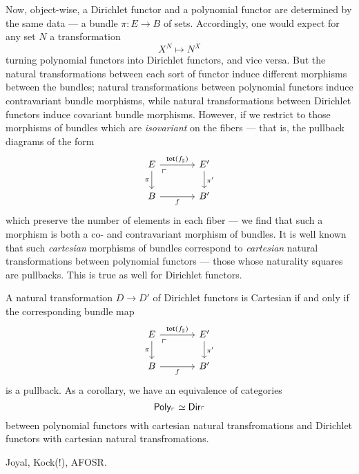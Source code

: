 Now, object-wise, a Dirichlet functor and a polynomial functor are determined by
the same data --- a bundle $\pi : E \to B$ of sets. Accordingly, one would
expect for any set $N$ a transformation
$$X^N \mapsto N^X$$
turning polynomial functors into Dirichlet functors, and vice versa. But the
natural transformations between each sort of functor induce different morphisms
between the bundles; natural transformations between polynomial functors induce
contravariant bundle morphisms, while natural transformations between Dirichlet
functors induce covariant bundle morphisms. However, if we restrict to those
morphisms of bundles which are \emph{isovariant} on the fibers --- that is, the
pullback diagrams of the form
\[
  \begin{tikzcd}[column sep=large]
E \arrow[r, "\term{tot}(f_{\sharp})"] \arrow[d, "\pi"'] \arrow[dr, phantom,
"\ulcorner" very near start] & E' \arrow[d, "\pi'"] \\
B \arrow[r, "f"']                                       & B'                  
\end{tikzcd}
\]
which preserve the number of elements in each fiber --- we find that such a morphism
is both a co- and contravariant morphism of bundles. It is well known that such
\emph{cartesian} morphisms of bundles correspond to \emph{cartesian} natural
transformations between polynomial functors  --- those whose naturality
squares are pullbacks. This is true as well for Dirichlet functors.
\begin{thm}
A natural transformation $D \to D'$ of Dirichlet functors is Cartesian if and
only if the corresponding bundle map
\[
  \begin{tikzcd}[column sep=large]
E \arrow[r, "\term{tot}(f_{\sharp})"] \arrow[d, "\pi"'] \arrow[dr, phantom,
"\ulcorner" very near start] & E' \arrow[d, "\pi'"] \\
B \arrow[r, "f"']                                       & B'                  
\end{tikzcd}
\]
is a pullback. As a corollary, we have an equivalence of categories
$$\mathsf{{Poly}}_{\ulcorner} \simeq \operatorname{\mathsf{{Dir}}}_{\ulcorner}$$
between polynomial functors with cartesian natural transfromations and Dirichlet
functors with cartesian natural transfromations.
\end{thm}



\begin{acknowledgements}
Joyal, Kock(!), AFOSR.
\end{acknowledgements}


